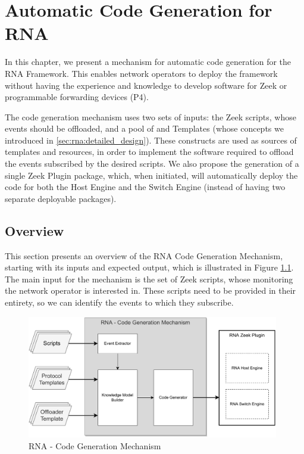 \chapter{Automatic Code Generation for RNA}
\label{cap:code_gen}

In this chapter, we present a mechanism for automatic code generation for the RNA Framework. This enables network operators to deploy the framework without having the experience and knowledge to develop software for Zeek or programmable forwarding devices (P4).

The code generation mechanism uses two sets of inputs: the Zeek scripts, whose events should be offloaded, and a pool of \ProtocolTemplates{} and \Offloader{} Templates (whose concepts we introduced in \autoref{sec:rna:detailed_design}). These constructs are used as sources of templates and resources, in order to implement the software required to offload the events subscribed by the desired scripts. We also propose the generation of a single Zeek Plugin package, which, when initiated, will automatically deploy the code for both the Host Engine and the Switch Engine (instead of having two separate deployable packages).




\section{Overview}
\label{sec:code_gen:overview}

This section presents an overview of the RNA Code Generation Mechanism, starting with its inputs and expected output, which is illustrated in Figure \ref{fig:code_gen_black_box}. The main input for the mechanism is the set of Zeek scripts, whose monitoring the network operator is interested in. These scripts need to be provided in their entirety, so we can identify the events to which they subscribe.

\begin{figure}[htb]
    \caption{RNA - Code Generation Mechanism}
    \begin{center}
        \includegraphics[width=0.98\textwidth]{images/code_gen_mechanism.pdf}
    \end{center}
    \label{fig:code_gen_black_box}
\end{figure}

